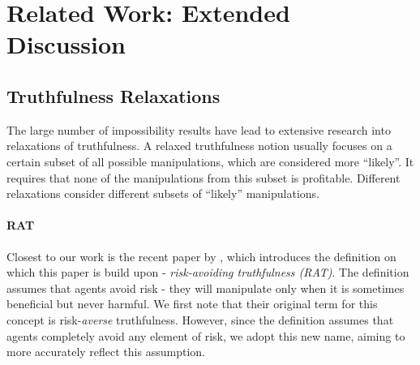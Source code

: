 
\section{Related Work: Extended Discussion}\label{apx:related}






\subsection{Truthfulness Relaxations}

The large number of impossibility results have lead to extensive research into relaxations of truthfulness. 
A relaxed truthfulness notion usually focuses on a certain subset of all possible manipulations, which are considered more ``likely''. It requires that none of the manipulations from this subset is profitable. Different relaxations consider different subsets of ``likely'' manipulations.





\paragraph{RAT}
Closest to our work is the recent paper by \cite{BU2023Rat}, which introduces the definition on which this paper is build upon - \emph{risk-avoiding truthfulness (RAT)}. 
The definition assumes that agents avoid risk - they will manipulate only when it is sometimes beneficial but never harmful. 
We first note that their original term for this concept is risk-\emph{averse} truthfulness. However, since the definition assumes that agents completely avoid any element of risk, we adopt this new name, aiming to more accurately reflect this assumption.

